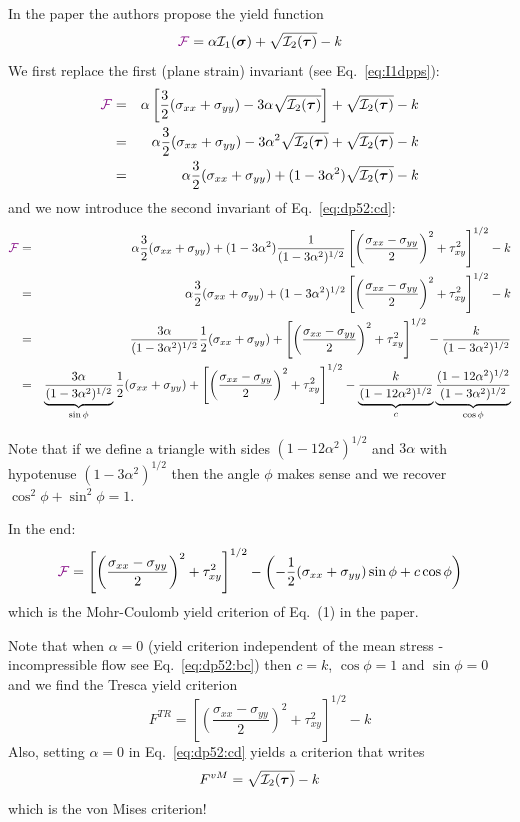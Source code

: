 In the paper the authors propose the yield function 
\[
{\color{violet}\cal F} = \alpha {\cal I}_1(\bm\sigma) + \sqrt{{\cal I}_2(\bm\tau)} - k
\]
We first replace the first (plane strain) invariant (see Eq.~\eqref{eq:I1dpps}):
\begin{eqnarray}
{\color{violet}\cal F} 
&=& \alpha \left[ \frac32(\sigma_{xx}+\sigma_{yy})- 3 \alpha \sqrt{{\cal I}_2(\bm\tau)} \right]
+ \sqrt{{\cal I}_2(\bm\tau)} - k \nonumber\\
&=&\alpha \frac32(\sigma_{xx}+\sigma_{yy})- 3 \alpha^2 \sqrt{{\cal I}_2(\bm\tau)}
+ \sqrt{{\cal I}_2(\bm\tau)} - k  \nonumber\\
&=&\alpha \frac32(\sigma_{xx}+\sigma_{yy}) +(1- 3 \alpha^2) \sqrt{{\cal I}_2(\bm\tau)} - k \nonumber
\end{eqnarray}
and we now introduce the second invariant of Eq.~\eqref{eq:dp52:cd}:
\begin{eqnarray}
{\color{violet}\cal F} &=& 
\alpha \frac32(\sigma_{xx}+\sigma_{yy}) +(1- 3 \alpha^2)
\frac{1}{(1 -3\alpha^2)^{1/2}} \left[\left(\frac{\sigma_{xx}-\sigma_{yy}}{2} \right)^2 
+ \tau_{xy}^2 \right]^{1/2} -  k  \nonumber\\
&=& \alpha \frac32(\sigma_{xx}+\sigma_{yy}) +(1- 3 \alpha^2)^{1/2}
\left[\left(\frac{\sigma_{xx}-\sigma_{yy}}{2} \right)^2 + \tau_{xy}^2 \right]^{1/2} 
- k  \nonumber\\
&=&\frac{3\alpha}{(1- 3 \alpha^2)^{1/2}}
\frac12(\sigma_{xx}+\sigma_{yy}) +
\left[\left(\frac{\sigma_{xx}-\sigma_{yy}}{2} \right)^2 + \tau_{xy}^2 \right]^{1/2} 
- \frac{k}{(1- 3 \alpha^2)^{1/2}} 
\nonumber\\
&=&\underbrace{\frac{3\alpha}{(1- 3 \alpha^2)^{1/2}}}_{\sin\phi}
\frac12(\sigma_{xx}+\sigma_{yy}) +
\left[\left(\frac{\sigma_{xx}-\sigma_{yy}}{2} \right)^2 + \tau_{xy}^2 \right]^{1/2} 
- \underbrace{\frac{k}{(1- 12 \alpha^2)^{1/2}}}_{c}
\underbrace{\frac{(1- 12 \alpha^2)^{1/2}}{(1- 3 \alpha^2)^{1/2}}}_{\cos\phi}
\end{eqnarray}


Note that if we define a triangle with sides $(1- 12 \alpha^2)^{1/2}$ and $3\alpha$
with hypotenuse $(1- 3 \alpha^2)^{1/2}$ then the angle $\phi$ makes sense and
we recover $\cos^2\phi+\sin^2\phi=1$.

In the end:
\[
{\color{violet}\cal F} = 
\left[\left(\frac{\sigma_{xx}-\sigma_{yy}}{2} \right)^2 + \tau_{xy}^2 \right]^{1/2}
-\left(-\frac12(\sigma_{xx}+\sigma_{yy}) \sin \phi + c \cos \phi \right)
\]
which is the Mohr-Coulomb yield criterion of Eq.~(1) in the paper.


Note that when $\alpha=0$ (yield criterion independent of the mean stress - 
incompressible flow see Eq.~\eqref{eq:dp52:bc}) then $c=k$, $\cos\phi=1$ and $\sin\phi=0$ and we find 
the Tresca yield criterion
\[
F^{TR}=  \left[\left(\frac{\sigma_{xx}-\sigma_{yy}}{2} \right)^2 + \tau_{xy}^2 \right]^{1/2} - k
\]
Also, setting $\alpha=0$ in Eq.~\eqref{eq:dp52:cd} yields a criterion that writes
\[
F^{vM}=\sqrt{{\cal I}_2(\bm\tau)} - k
\]
which is the von Mises criterion! 

